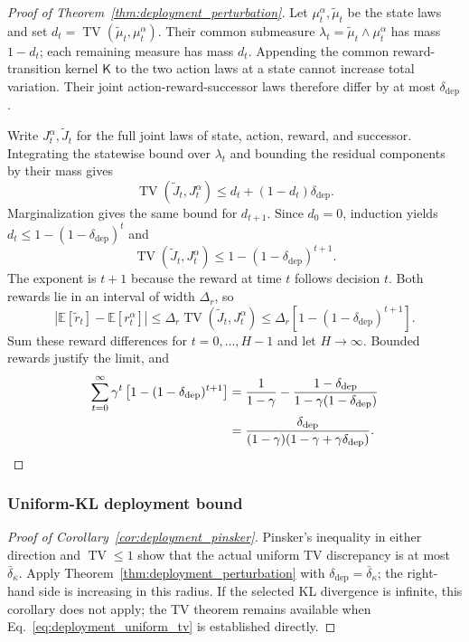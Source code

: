\documentclass{article}
\theoremstyle{plain}
\theoremstyle{definition}
\theoremstyle{remark}
\newcommand{\E}{\mathbb{E}}
\begin{document}
\begin{proof}[Proof of Theorem~\ref{thm:deployment_perturbation}]
Let $\mu_t^\alpha,\widetilde\mu_t$ be the state laws and set
$d_t=\operatorname{TV}(\widetilde\mu_t,\mu_t^\alpha)$. Their common
submeasure $\lambda_t=\widetilde\mu_t\wedge\mu_t^\alpha$ has mass
$1-d_t$; each remaining measure has mass $d_t$. Appending the common
reward-transition kernel $\mathsf K$ to the two action laws at a state
cannot increase total variation. Their joint action-reward-successor laws
therefore differ by at most $\delta_{\mathrm{dep}}$.

Write $J_t^\alpha,\widetilde J_t$ for the full joint laws of state, action,
reward, and successor. Integrating the statewise bound over $\lambda_t$
and bounding the residual components by their mass gives
\[
\operatorname{TV}(\widetilde J_t,J_t^\alpha)
\le d_t+(1-d_t)\delta_{\mathrm{dep}}.
\]
Marginalization gives the same bound for $d_{t+1}$. Since $d_0=0$,
induction yields $d_t\le1-(1-\delta_{\mathrm{dep}})^t$ and
\[
\operatorname{TV}(\widetilde J_t,J_t^\alpha)
\le1-(1-\delta_{\mathrm{dep}})^{t+1}.
\]
The exponent is $t+1$ because the reward at time $t$ follows decision $t$.
Both rewards lie in an interval of width $\Delta_r$, so
\[
\left|\E[\widetilde r_t]-\E[r_t^\alpha]\right|
\le\Delta_r\operatorname{TV}(\widetilde J_t,J_t^\alpha)
\le\Delta_r\left[1-(1-\delta_{\mathrm{dep}})^{t+1}\right].
\]
Sum these reward differences for $t=0,\ldots,H-1$ and let $H\to\infty$.
Bounded rewards justify the limit, and
\begin{align*}
\sum_{t=0}^{\infty}\gamma^t
\left[1-(1-\delta_{\mathrm{dep}})^{t+1}\right]
&=\frac{1}{1-\gamma}
-\frac{1-\delta_{\mathrm{dep}}}
{1-\gamma(1-\delta_{\mathrm{dep}})}\\
&=\frac{\delta_{\mathrm{dep}}}
{(1-\gamma)(1-\gamma+\gamma\delta_{\mathrm{dep}})}.
\qedhere
\end{align*}
\end{proof}

\subsubsection{Uniform-KL deployment bound}
\label{app:proof_deployment_kl}

\begin{proof}[Proof of Corollary~\ref{cor:deployment_pinsker}]
Pinsker's inequality in either direction and $\operatorname{TV}\le1$ show
that the actual uniform TV discrepancy is at most $\bar\delta_\kappa$. Apply
Theorem~\ref{thm:deployment_perturbation} with
$\delta_{\mathrm{dep}}=\bar\delta_\kappa$; the right-hand side is
increasing in this radius. If
the selected KL divergence is infinite, this corollary does not apply; the TV
theorem remains available when Eq.~\eqref{eq:deployment_uniform_tv} is
established directly.
\end{proof}
\end{document}
